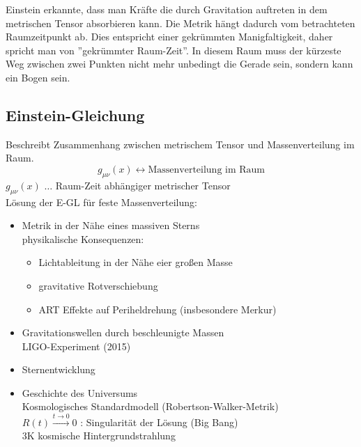 \documentclass[a4paper, 11pt]{article}
\numberwithin{equation}{section}
\begin{document}
Einstein erkannte, dass man Kräfte die durch Gravitation auftreten in dem metrischen Tensor absorbieren kann. Die Metrik hängt dadurch vom betrachteten Raumzeitpunkt ab. Dies entspricht einer gekrümmten Manigfaltigkeit, daher spricht man von ''gekrümmter Raum-Zeit''. In diesem Raum muss der kürzeste Weg zwischen zwei Punkten nicht mehr unbedingt die Gerade sein, sondern kann ein Bogen sein.

\subsection*{Einstein-Gleichung}
Beschreibt Zusammenhang zwischen metrischem Tensor und Massenverteilung im Raum.
\begin{equation*}
g_{\mu \nu}(x) \leftrightarrow \text{Massenverteilung im Raum}
\end{equation*}
$g_{\mu \nu}(x)$ $\dots$ Raum-Zeit abhängiger metrischer Tensor\\
Lösung der E-GL für feste Massenverteilung:

\renewcommand{\labelitemi}{$\rightarrow$}
\begin{itemize}
\item Metrik in der Nähe eines massiven Sterns\\
physikalische Konsequenzen: 
\begin{itemize}
\item Lichtableitung in der Nähe eier großen Masse
\item gravitative Rotverschiebung
\item ART Effekte auf Periheldrehung (insbesondere Merkur) 
\end{itemize}

\item Gravitationswellen durch beschleunigte Massen \\
LIGO-Experiment (2015)
\item Sternentwicklung\\

\item Geschichte des Universums \\
Kosmologisches Standardmodell (Robertson-Walker-Metrik)\\
$R(t) \xrightarrow{t \rightarrow 0} 0$ : Singularität der Lösung (Big Bang)\\
3K kosmische Hintergrundstrahlung
\end{itemize}
\end{document}
